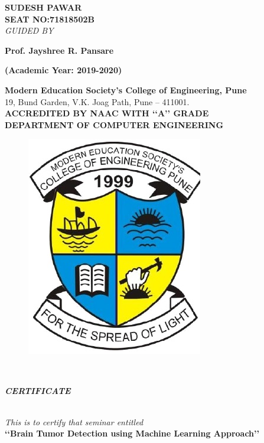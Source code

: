 \documentclass[a4paper, 12pt]{report}
\begin{document}
\begin{frontmatter}
\begin{titlepage}
\begin{center}
\textbf{SUDESH PAWAR}\\
{\small\textbf{SEAT NO:71818502B}}\\[0.7cm]

\textit{GUIDED BY}\\[0.5cm]
\begin{large}\textbf{Prof. Jayshree R. Pansare}\\[0.3cm]\end{large}
\textbf{(Academic Year: 2019-2020)}
\vfill
\end{center}
\end{titlepage}
\begin{titlepage}
\begin{center}
\textup{\large \textbf{Modern Education Society\rq s College of Engineering, Pune}}\\19, Bund Garden, V.K. Joag Path, Pune – 411001.\\[0.8cm]\textbf{ACCREDITED BY NAAC WITH {\lq\lq A\rq\rq} GRADE}\\[0.8cm]\textbf{\large DEPARTMENT OF COMPUTER ENGINEERING}
\begin{figure}[h]
\centering
\includegraphics[width=0.3\linewidth]{./logo1}
\end{figure}
\\
\begin{LARGE}
\textbf{\textit {CERTIFICATE}}\end{LARGE}\\[1.2cm]
\textit{This is to certify that seminar entitled}\\[0.5cm]\large\textbf{\lq\lq Brain Tumor Detection using Machine Learning Approach\rq\rq}

\end{center}
\end{titlepage}
\end{frontmatter}
\end{document}
